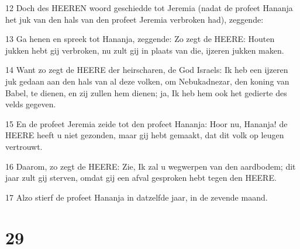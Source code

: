 \par 12 Doch des HEEREN woord geschiedde tot Jeremia (nadat de profeet Hananja het juk van den hals van den profeet Jeremia verbroken had), zeggende:
\par 13 Ga henen en spreek tot Hananja, zeggende: Zo zegt de HEERE: Houten jukken hebt gij verbroken, nu zult gij in plaats van die, ijzeren jukken maken.
\par 14 Want zo zegt de HEERE der heirscharen, de God Israels: Ik heb een ijzeren juk gedaan aan den hals van al deze volken, om Nebukadnezar, den koning van Babel, te dienen, en zij zullen hem dienen; ja, Ik heb hem ook het gedierte des velds gegeven.
\par 15 En de profeet Jeremia zeide tot den profeet Hananja: Hoor nu, Hananja! de HEERE heeft u niet gezonden, maar gij hebt gemaakt, dat dit volk op leugen vertrouwt.
\par 16 Daarom, zo zegt de HEERE: Zie, Ik zal u wegwerpen van den aardbodem; dit jaar zult gij sterven, omdat gij een afval gesproken hebt tegen den HEERE.
\par 17 Alzo stierf de profeet Hananja in datzelfde jaar, in de zevende maand.

\chapter{29}

